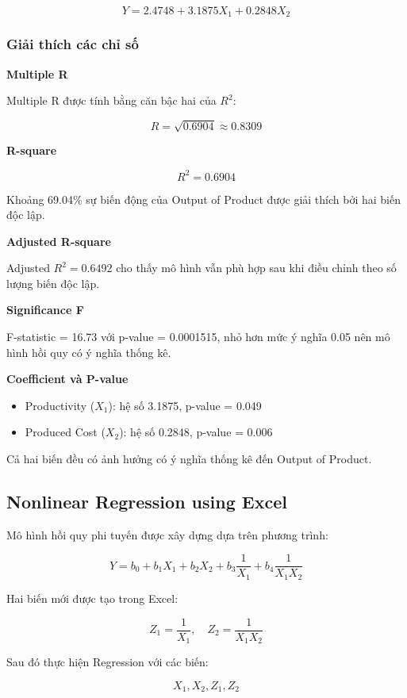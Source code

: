 \begin{equation}
Y = 2.4748 + 3.1875X_1 + 0.2848X_2
\end{equation}

\subsubsection*{Giải thích các chỉ số}

\textbf{Multiple R}

Multiple R được tính bằng căn bậc hai của $R^2$:

\[
R = \sqrt{0.6904} \approx 0.8309
\]

\textbf{R-square}

\[
R^2 = 0.6904
\]

Khoảng 69.04\% sự biến động của Output of Product được giải thích
bởi hai biến độc lập.

\textbf{Adjusted R-square}

Adjusted $R^2 = 0.6492$ cho thấy mô hình vẫn phù hợp sau khi
điều chỉnh theo số lượng biến độc lập.

\textbf{Significance F}

F-statistic = 16.73 với p-value = 0.0001515, nhỏ hơn mức ý nghĩa
0.05 nên mô hình hồi quy có ý nghĩa thống kê.

\textbf{Coefficient và P-value}

\begin{itemize}
\item Productivity ($X_1$): hệ số 3.1875, p-value = 0.049
\item Produced Cost ($X_2$): hệ số 0.2848, p-value = 0.006
\end{itemize}

Cả hai biến đều có ảnh hưởng có ý nghĩa thống kê đến Output of Product.

\subsection{Nonlinear Regression using Excel}

Mô hình hồi quy phi tuyến được xây dựng dựa trên phương trình:

\[
Y = b_0 + b_1X_1 + b_2X_2 + b_3\frac{1}{X_1} + b_4\frac{1}{X_1X_2}
\]

Hai biến mới được tạo trong Excel:

\[
Z_1 = \frac{1}{X_1}, \quad Z_2 = \frac{1}{X_1X_2}
\]

Sau đó thực hiện Regression với các biến:

\[
X_1, X_2, Z_1, Z_2
\]

